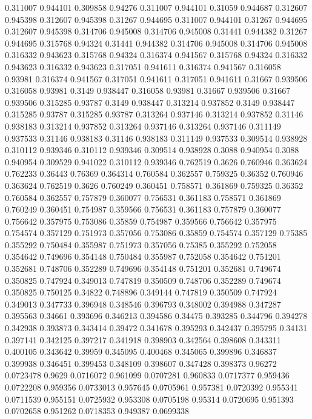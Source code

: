0.311007 0.944101
0.309858 0.94276
0.311007 0.944101
0.31059 0.944687
0.312607 0.945398
0.312607 0.945398
0.31267 0.944695
0.311007 0.944101
0.31267 0.944695
0.312607 0.945398
0.314706 0.945008
0.314706 0.945008
0.31441 0.944382
0.31267 0.944695
0.315768 0.94324
0.31441 0.944382
0.314706 0.945008
0.314706 0.945008
0.316332 0.943623
0.315768 0.94324
0.316374 0.941567
0.315768 0.94324
0.316332 0.943623
0.316332 0.943623
0.317051 0.941611
0.316374 0.941567
0.316058 0.93981
0.316374 0.941567
0.317051 0.941611
0.317051 0.941611
0.31667 0.939506
0.316058 0.93981
0.3149 0.938447
0.316058 0.93981
0.31667 0.939506
0.31667 0.939506
0.315285 0.93787
0.3149 0.938447
0.313214 0.937852
0.3149 0.938447
0.315285 0.93787
0.315285 0.93787
0.313264 0.937146
0.313214 0.937852
0.31146 0.938183
0.313214 0.937852
0.313264 0.937146
0.313264 0.937146
0.311149 0.937533
0.31146 0.938183
0.31146 0.938183
0.311149 0.937533
0.309514 0.938928
0.310112 0.939346
0.310112 0.939346
0.309514 0.938928
0.3088 0.940954
0.3088 0.940954
0.309529 0.941022
0.310112 0.939346
0.762519 0.3626
0.760946 0.363624
0.762233 0.36443
0.76369 0.364314
0.760584 0.362557
0.759325 0.36352
0.760946 0.363624
0.762519 0.3626
0.760249 0.360451
0.758571 0.361869
0.759325 0.36352
0.760584 0.362557
0.757879 0.360077
0.756531 0.361183
0.758571 0.361869
0.760249 0.360451
0.754987 0.359566
0.756531 0.361183
0.757879 0.360077
0.756642 0.357975
0.753086 0.35859
0.754987 0.359566
0.756642 0.357975
0.754574 0.357129
0.751973 0.357056
0.753086 0.35859
0.754574 0.357129
0.75385 0.355292
0.750484 0.355987
0.751973 0.357056
0.75385 0.355292
0.752058 0.354642
0.749696 0.354148
0.750484 0.355987
0.752058 0.354642
0.751201 0.352681
0.748706 0.352289
0.749696 0.354148
0.751201 0.352681
0.749674 0.350825
0.747924 0.349013
0.747819 0.350509
0.748706 0.352289
0.749674 0.350825
0.750125 0.34822
0.748896 0.349144
0.747819 0.350509
0.747924 0.349013
0.347733 0.396948
0.348546 0.396793
0.348002 0.394988
0.347287 0.395563
0.34661 0.393696
0.346213 0.394586
0.34475 0.393285
0.344796 0.394278
0.342938 0.393873
0.343414 0.39472
0.341678 0.395293
0.342437 0.395795
0.34131 0.397141
0.342125 0.397217
0.341918 0.398903
0.342564 0.398608
0.343311 0.400105
0.343642 0.39959
0.345095 0.400468
0.345065 0.399896
0.346837 0.399938
0.346451 0.399453
0.348109 0.398607
0.347428 0.398373
0.96272 0.0723478
0.9629 0.0716072
0.961099 0.0707281
0.960833 0.0717377
0.959436 0.0722208
0.959356 0.0733013
0.957645 0.0705961
0.957381 0.0720392
0.955341 0.0711539
0.955151 0.0725932
0.953308 0.0705198
0.95314 0.0720695
0.951393 0.0702658
0.951262 0.0718353
0.949387 0.0699338
